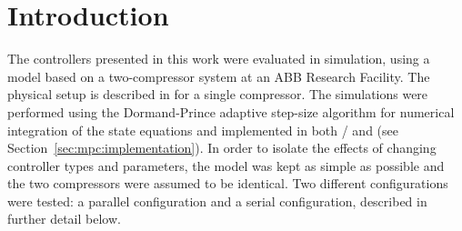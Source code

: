 \section{Introduction}

The controllers presented in this work were evaluated in simulation, using a model based on a two-compressor system at an ABB Research Facility. 
The physical setup is described in \cite{Cortinovis2015} for a single compressor.
The simulations were performed using the Dormand-Prince adaptive step-size algorithm for numerical integration of the state equations and implemented in both \mlab{}/\slink{} and \cpp{} (see Section~\ref{sec:mpc:implementation}).
In order to isolate the effects of changing controller types and parameters, the model was kept as simple as possible and the two compressors were assumed to be identical.
Two different configurations were tested: a parallel configuration and a serial configuration, described in further detail below.


